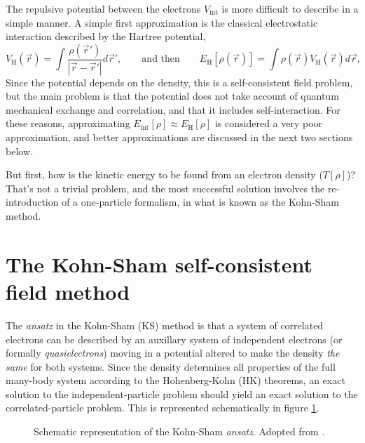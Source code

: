 \documentclass[11pt,bibliography=totoc,index=totoc]{scrbook}   %
\begin{document}
The repulsive potential between the electrons $V_{\text{int}}$ is more difficult to describe in a simple manner.
A simple first approximation is the classical electrostatic interaction described by the Hartree potential,
\begin{equation}
    V_{\text{H}}(\vec{r}) = \int\frac{\rho(\vec{r}')}{|\vec{r}-\vec{r}'|}d\vec{r}',
  \qquad\text{and then}\qquad
  E_{\text{H}}[\rho(\vec{r})] = \int \rho(\vec{r}) V_{\text{H}}(\vec{r}) d\vec{r},
  \label{eq:hartree-pot}
\end{equation}
Since the potential depends on the density, this is a self-consistent field problem, 
but the main problem is that the potential does not take account of quantum mechanical exchange and correlation, and that it includes self-interaction.
For these reasons, approximating $E_{\text{int}}[\rho]\approx E_{\text{H}}[\rho]$ is considered a very poor approximation,\cite[208]{Sutton:1993}
and better approximations are discussed in the next two sections below.

But first, how is the kinetic energy to be found from an electron density ($T[\rho]$)?
That's not a trivial problem, and the most successful solution involves the re-introduction of a one-particle formalism, in what is known as the Kohn-Sham method.

%
\section{The Kohn-Sham self-consistent field method}\label{sec:kohnsham}
%

The \emph{ansatz} in the Kohn-Sham (KS) method\cite{KohnSham:1965} is that a system of correlated electrons can be described by an auxillary system of independent electrons (or formally \emph{quasielectrons}) moving in a potential altered to make the density \emph{the same} for both systems. 
Since the density determines all properties of the full many-body system according to the Hohenberg-Kohn (HK) theorems, an exact solution to the independent-particle problem should yield an exact solution to the correlated-particle problem.
This is represented schematically in figure \ref{fig:kohnshamscheme}. 

\begin{figure}[htbp]
  \centering
  
  \caption{Schematic representation of the Kohn-Sham \emph{ansatz}. Adopted from \cite[137]{Martin:2004}.}
  \label{fig:kohnshamscheme}
\end{figure}
\end{document}
